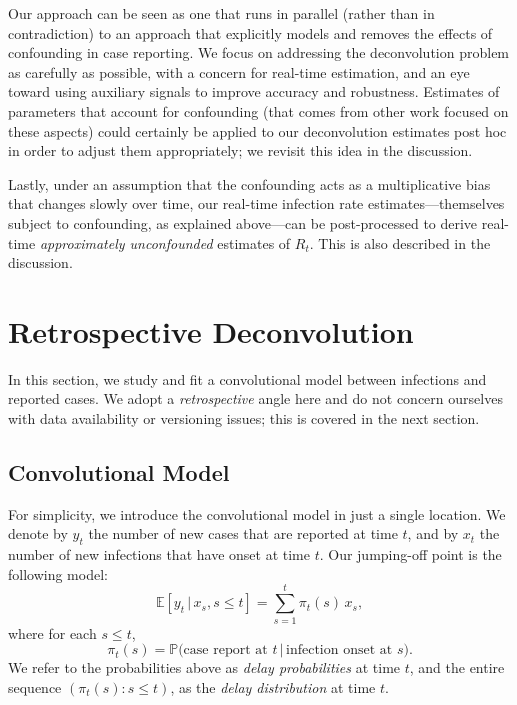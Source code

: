 \documentclass[sts]{imsart}
\def\E{\mathbb{E}}
\def\P{\mathbb{P}}
\theoremstyle{plain}
\theoremstyle{definition}
\theoremstyle{remark}
\begin{document}
Our approach can be seen as one that runs in parallel (rather than in
contradiction) to an approach that explicitly models and removes the effects of
confounding in case reporting. We focus on addressing the deconvolution problem
as carefully as possible, with a concern for real-time estimation, and an eye
toward using auxiliary signals to improve accuracy and robustness. Estimates of
parameters that account for confounding (that comes from other work focused on  
these aspects) could certainly be applied to our deconvolution estimates post
hoc in order to adjust them appropriately; we revisit this idea in the
discussion. 

Lastly, under an assumption that the confounding acts as a multiplicative bias
that changes slowly over time, our real-time infection rate
estimates---themselves subject to confounding, as explained above---can be
post-processed to derive real-time \emph{approximately unconfounded} estimates
of $R_t$. This is also described in the discussion.

\section{Retrospective Deconvolution}
\label{sec:deconv_retro}

In this section, we study and fit a convolutional model between infections and  
reported cases. We adopt a \emph{retrospective} angle here and do not concern
ourselves with data availability or versioning issues; this is covered in the
next section.   

\subsection{Convolutional Model}
\label{sec:conv_model}

For simplicity, we introduce the convolutional model in just a single
location. We denote by $y_t$ the number of new cases that are reported at time
$t$, and by $x_t$ the number of new infections that have onset at time $t$. Our
jumping-off point is the following model:
\begin{equation}
\label{eq:conv_model1}
\E[y_t \,|\, x_s, s \leq t] = \sum_{s=1}^t \pi_t(s) \, x_s, 
\end{equation}
where for each $s \leq t$,
\begin{equation}
\label{eq:delay_prob1}
\pi_t(s) = \P\big( \text{case report at $t$} \,|\, \text{infection onset at   
  $s$} \big). 
\end{equation}
We refer to the probabilities above as \emph{delay probabilities} at time $t$,
and the entire sequence $(\pi_t(s) : s \leq t)$, as the \emph{delay
  distribution} at time $t$. 
\end{document}
